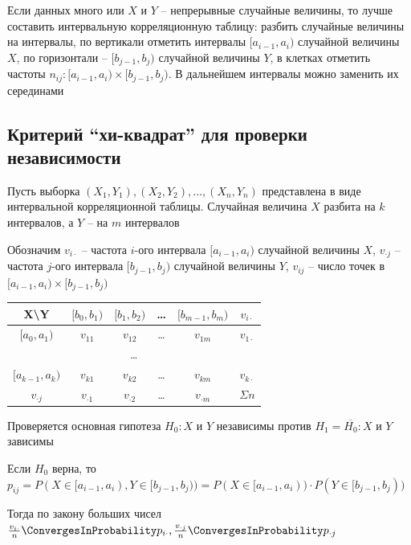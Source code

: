 \documentclass[12pt]{article}
\begin{document}
\Nota Если данных много или $X$ и $Y$ -- непрерывные случайные величины, то лучше составить интервальную корреляционную таблицу:
разбить случайные величины на интервалы, по вертикали отметить интервалы $[a_{i - 1}, a_i)$ случайной величины $X$, 
по горизонтали -- $[b_{j - 1}, b_j)$ случайной величины $Y$, в клетках 
отметить частоты $n_{ij} : [a_{i - 1}, a_i) \times [b_{j - 1}, b_j)$. В дальнейшем интервалы можно заменить их серединами

\hypertarget{chi_square_independence_criterion}{}

\subsection{Критерий \enquote{хи-квадрат} для проверки независимости}

Пусть выборка $(X_1, Y_1), (X_2, Y_2), \dots, (X_n, Y_n)$ представлена в виде интервальной корреляционной таблицы. Случайная величина $X$ 
разбита на $k$ интервалов, а $Y$ -- на $m$ интервалов

Обозначим $v_{i\cdot}$ -- частота $i$-ого интервала $[a_{i - 1}, a_i)$ случайной величины $X$, 
$v_{\cdot j}$ -- частота $j$-ого интервала $[b_{j - 1}, b_j)$ случайной величины $Y$, $v_{ij}$ -- число точек в $[a_{i - 1}, a_i) \times [b_{j - 1}, b_j)$


\begin{tabular}{c|c|c|c|c|c}
    X\backslash Y & $[b_0, b_1)$ & $[b_1, b_2)$ & \dots & $[b_{m - 1}, b_m)$ & $v_{i\cdot}$ \\
    \hline
    $[a_0, a_1)$ & $v_{11}$ & $v_{12}$ & \dots & $v_{1m}$ & $v_{1\cdot}$ \\
    \hline
    \multicolumn{6}{c}{\dots} \\
    \hline
    $[a_{k - 1}, a_k)$ & $v_{k1}$ & $v_{k2}$ & \dots & $v_{km}$ & $v_{k\cdot}$ \\
    \hline
    $v_{\cdot j}$ & $v_{\cdot 1}$ & $v_{\cdot 2}$ & \dots & $v_{\cdot m}$ & $\Sigma n$ \\
\end{tabular}

Проверяется основная гипотеза $H_0 : X \text{ и } Y$ независимы против $H_1 = \overline{H_0} : X \text{ и } Y$ зависимы

Если $H_0$ верна, то $p_{ij} = P(X \in [a_{i - 1}, a_i), Y \in [b_{j - 1}, b_j)) = P(X \in [a_{i - 1}, a_i)) \cdot P(Y \in [b_{j - 1}, b_j))$

Тогда по закону больших чисел $\frac{v_{i\cdot}}{n} \ConvergesInProbability p_{i\cdot}, \frac{v_{\cdot j}}{n} \ConvergesInProbability p_{\cdot j}$
\end{document}
